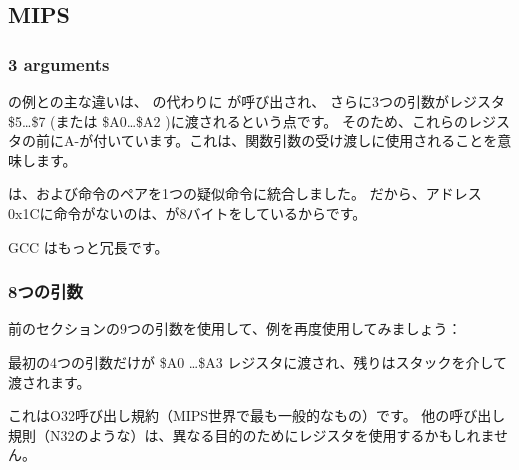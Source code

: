 \subsection{MIPS}

\subsubsection{3 arguments}


\q{\HelloWorldSectionName} の例との主な違いは、 \puts の代わりに \printf が呼び出され、
さらに3つの引数がレジスタ \$5\dots \$7 (または \$A0\dots \$A2 )に渡されるという点です。 
そのため、これらのレジスタの前にA-が付いています。これは、関数引数の受け渡しに使用されることを意味します。





\IDA は、および命令のペアを1つの疑似命令に統合しました。 
だから、アドレス0x1Cに命令がないのは、が8バイトをしているからです。


\NonOptimizing GCC はもっと冗長です。





\subsubsection{8つの引数}

前のセクションの9つの引数を使用して、例を再度使用してみましょう：




最初の4つの引数だけが \$A0 \dots \$A3 レジスタに渡され、残りはスタックを介して渡されます。

これはO32呼び出し規約（MIPS世界で最も一般的なもの）です。 
他の呼び出し規則（N32のような）は、異なる目的のためにレジスタを使用するかもしれません。

